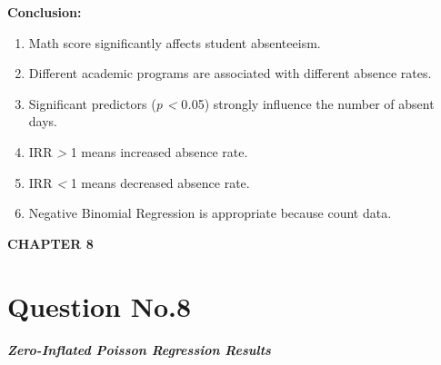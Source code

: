\textbf{Conclusion:}

\begin{enumerate}
\def\labelenumi{\arabic{enumi}.}
\item
  Math score significantly affects student absenteeism.
\item
  Different academic programs are associated with different absence
  rates.
\item
  Significant predictors (\emph{p \textless{}} 0\emph{.}05) strongly
  influence the number of absent days.
\item
  IRR \emph{\textgreater{}} 1 means increased absence rate.
\item
  IRR \emph{\textless{}} 1 means decreased absence rate.
\item
  Negative Binomial Regression is appropriate because count data.
\end{enumerate}

\textbf{CHAPTER 8}

\section{Question No.8}\label{question-no.8}

\subparagraph{Zero-Inflated Poisson Regression
Results}\label{zero-inflated-poisson-regression-results}

